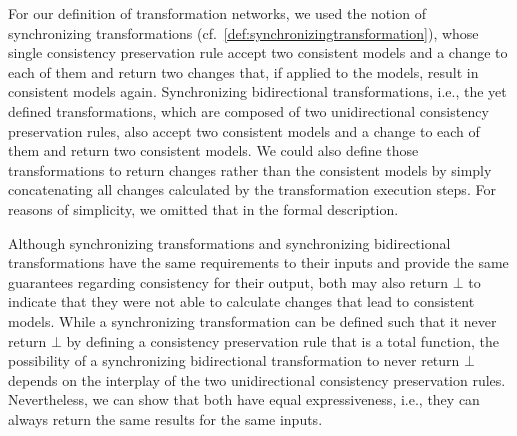 For our definition of transformation networks, we used the notion of synchronizing transformations (cf.~\autoref{def:synchronizingtransformation}), whose single consistency preservation rule accept two consistent models and a change to each of them and return two changes that, if applied to the models, result in consistent models again.
Synchronizing bidirectional transformations, i.e., the yet defined transformations, which are composed of two unidirectional consistency preservation rules, also accept two consistent models and a change to each of them and return two consistent models.
We could also define those transformations to return changes rather than the consistent models by simply concatenating all changes calculated by the transformation execution steps.
For reasons of simplicity, we omitted that in the formal description.

Although synchronizing transformations and synchronizing bidirectional transformations have the same requirements to their inputs and provide the same guarantees regarding consistency for their output, both may also return $\bot$ to indicate that they were not able to calculate changes that lead to consistent models.
While a synchronizing transformation can be defined such that it never return $\bot$ by defining a consistency preservation rule that is a total function, the possibility of a synchronizing bidirectional transformation to never return $\bot$ depends on the interplay of the two unidirectional consistency preservation rules.
Nevertheless, we can show that both have equal expressiveness, i.e., they can always return the same results for the same inputs.

